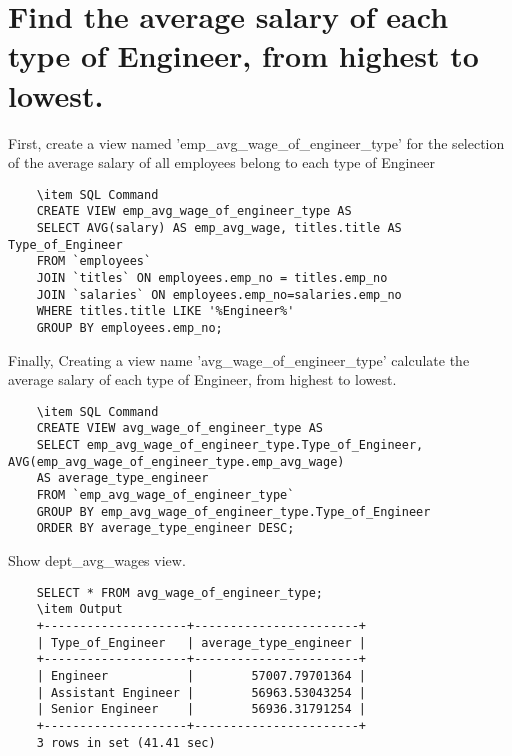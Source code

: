 \documentclass[13pt,a4paper]{report}
\begin{document}
\section{ Find the average salary of each type of Engineer, from highest to lowest. }
\begin{itemize}
First, create a view named 'emp_avg_wage_of_engineer_type' for the selection of the average salary of all employees belong to each type of Engineer
\begin{lstlisting}
	\item SQL Command
	CREATE VIEW emp_avg_wage_of_engineer_type AS
	SELECT AVG(salary) AS emp_avg_wage, titles.title AS Type_of_Engineer 
	FROM `employees` 
	JOIN `titles` ON employees.emp_no = titles.emp_no
	JOIN `salaries` ON employees.emp_no=salaries.emp_no 
	WHERE titles.title LIKE '%Engineer%' 
	GROUP BY employees.emp_no;
\end{lstlisting}
Finally, Creating a view name 'avg_wage_of_engineer_type' calculate the average salary of each type of Engineer, from highest to lowest.
\begin{lstlisting}
	\item SQL Command
	CREATE VIEW avg_wage_of_engineer_type AS
	SELECT emp_avg_wage_of_engineer_type.Type_of_Engineer, AVG(emp_avg_wage_of_engineer_type.emp_avg_wage) 
	AS average_type_engineer 
	FROM `emp_avg_wage_of_engineer_type`
	GROUP BY emp_avg_wage_of_engineer_type.Type_of_Engineer 
	ORDER BY average_type_engineer DESC;
\end{lstlisting}
Show dept_avg_wages view.
\begin{lstlisting}
	SELECT * FROM avg_wage_of_engineer_type;
	\item Output
	+--------------------+-----------------------+
	| Type_of_Engineer   | average_type_engineer |
	+--------------------+-----------------------+
	| Engineer           |        57007.79701364 |
	| Assistant Engineer |        56963.53043254 |
	| Senior Engineer    |        56936.31791254 |
	+--------------------+-----------------------+
	3 rows in set (41.41 sec)

\end{lstlisting}
\end{itemize}
\end{document}
